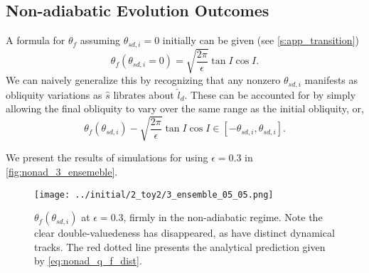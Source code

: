\documentclass[
        fleqn,
        usenatbib,
    ]{mnras}
\newcommand*{\p}[1]{\left(#1\right)}
\newcommand*{\s}[1]{\left[#1\right]}
\begin{document}
\subsection{Non-adiabatic Evolution Outcomes}

A formula for $\theta_{f}$ assuming $\theta_{sd, i} = 0$ initially can be
given (see \autoref{s:app_transition})
\begin{equation}
    \theta_{f}\p{\theta_{sd, i} = 0} = \sqrt{\frac{2\pi}{\epsilon}}
        \tan I\cos I.\label{eq:nonad_q_f}
\end{equation}
We can naively generalize this by recognizing that any nonzero $\theta_{sd, i}$
manifests as obliquity variations as $\hat{s}$ librates about $\hat{l}_d$. These
can be accounted for by simply allowing the final obliquity to vary over the
same range as the initial obliquity, or,
\begin{equation}
    \theta_{f}\p{\theta_{sd, i}} - \sqrt{\frac{2\pi}{\epsilon}}
        \tan I\cos I\in \s{-\theta_{sd, i}, \theta_{sd,i}}
        .\label{eq:nonad_q_f_dist}
\end{equation}

We present the results of simulations for using $\epsilon = 0.3$ in
\autoref{fig:nonad_3_ensemeble}.
\begin{figure}
    \centering
    \texttt{[image: ../initial/2\_toy2/3\_ensemble\_05\_05.png]}
    \caption{$\theta_{ f}\p{\theta_{sd, i}}$ at $\epsilon = 0.3$, firmly in
    the non-adiabatic regime. Note the clear double-valuedeness has disappeared,
    as have distinct dynamical tracks. The red dotted line presents the
    analytical prediction given by
    \autoref{eq:nonad_q_f_dist}.}\label{fig:nonad_3_ensemeble}
\end{figure}
\end{document}
